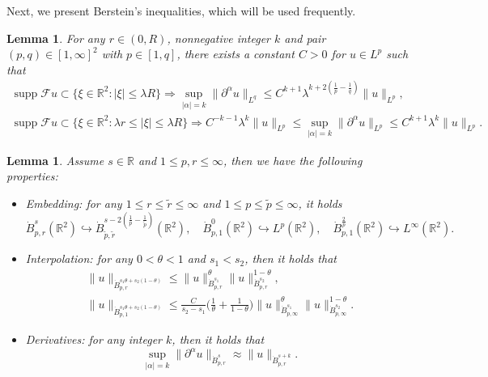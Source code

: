 \documentclass[10pt,a4paper]{amsart}
\numberwithin{equation}{section}
\newtheorem{lemma}[theorem]{Lemma}
\begin{document}
Next, we present Berstein's inequalities, which will be used frequently.

\begin{lemma} \label{lem2.1}
For any $r\in(0,R)$, nonnegative integer $k$ and pair $(p,q)\in[1,\infty]^2$ with
$p\in[1,q]$, there exists a constant $C>0$ for $u\in L^p$ such that
\begin{gather*}
 \operatorname{supp}\mathcal{F}u\subset \{\xi\in\mathbb{R}^2:
 |\xi|\leqslant\lambda R\}
 \Rightarrow\sup _{|\alpha|=k}\|\partial^\alpha u\|_{L^q}
 \leqslant C^{k+1}\lambda^{k+2(\frac{1}{p}-\frac{1}{q})}\|u\|_{L^p},\\
 \operatorname{supp}\mathcal{F}u\subset\{\xi\in\mathbb{R}^2:
 \lambda r\leqslant|\xi|\leqslant\lambda R\}\Rightarrow C^{-k-1}
 \lambda^k\|u\|_{L^p}\leqslant\sup _{|\alpha|=k}
 \|\partial^\alpha u\|_{L^p}\leqslant C^{k+1}\lambda^{k}\|u\|_{L^p}.
 \end{gather*}
\end{lemma}


\begin{lemma}\label{lem2.2}
Assume $s\in \mathbb{R}$ and $1\leqslant p,r\leqslant\infty$, then we have the
following properties:
 \begin{itemize}
\item[(1)] Embedding: for any $1\leqslant r \leqslant\tilde{r}\leqslant\infty$ and
$1\leqslant p \leqslant\tilde{p}\leqslant\infty$, it holds
\begin{equation} \label{2.1}
\dot{B}^s_{p,r}(\mathbb{R}^2)\hookrightarrow\dot{B}^{s-2(\frac{1}{p}
-\frac{1}{\tilde{p}})}_{\tilde{p},\tilde{r}}(\mathbb{R}^2),\quad
\dot{B}^0_{p,1}(\mathbb{R}^2)\hookrightarrow L^p(\mathbb{R}^2), \quad
\dot{B}^{\frac{2}{p}}_{p,1}(\mathbb{R}^2)\hookrightarrow L^\infty(\mathbb{R}^2).
\end{equation}

\item[(2)] Interpolation: for any $0<\theta<1$ and $s_1<s_2$, then it holds that
\begin{gather}
\|u\|_{\dot{B}^{ s_1\theta+s_2(1-\theta)}_{p,r}}
 \leqslant \|u\|_{\dot{B}^{s_1}_{p,r}}^\theta\|u\|_{\dot{B}^{s_2}_{p,r}}^{1-\theta}, \label{2.2}\\
\|u\|_{\dot{B}^{ s_1\theta+s_2(1-\theta)}_{p,1}}
 \leqslant\frac{C}{s_2-s_1}\Big(\frac{1}{\theta}+\frac{1}{1-\theta}\Big)
 \|u\|_{\dot{B}^{s_1}_{p,\infty}}^\theta\|u\|_{\dot{B}^{s_2}_{p,\infty}}^{1-\theta}.
 \label{2.3}
\end{gather}

\item[(3)] Derivatives: for any integer $k$, then it holds that
\begin{equation} \label{2.4}
 \sup _{|\alpha|=k}\|\partial^\alpha u\|_{\dot{B}^{s}_{p,r}}
 \approx\|u\|_{\dot{B}^{s+k}_{p,r}}.
\end{equation}
 \end{itemize}
\end{lemma}
\end{document}
